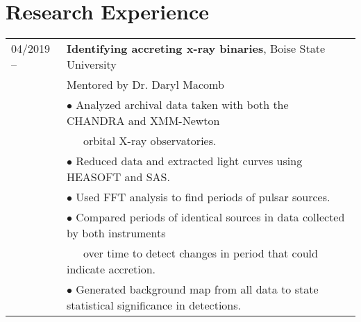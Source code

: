\documentclass[11pt]{article}
\begin{document}
\section{Research Experience}
\begin{tabular}{ll}
04/2019 --		& 	\textbf{Identifying accreting x-ray binaries}, Boise State University \vspace{1mm} \\
			&	Mentored by Dr. Daryl Macomb\\
      & $\bullet$ Analyzed archival data taken with both the CHANDRA and XMM-Newton \\
      &  \-\ \-\ \-\ orbital X-ray observatories.\\
      & $\bullet$ Reduced data and extracted light curves using HEASOFT and SAS.\\
      & $\bullet$ Used FFT analysis to find periods of pulsar sources.\\
      & $\bullet$ Compared periods of identical sources in data collected by both instruments \\
      & \-\ \-\ \-\ over time to detect changes in period that could indicate accretion.\\
      & $\bullet$ Generated background map from all data to state statistical significance in detections.\\

\end{tabular}
\end{document}
